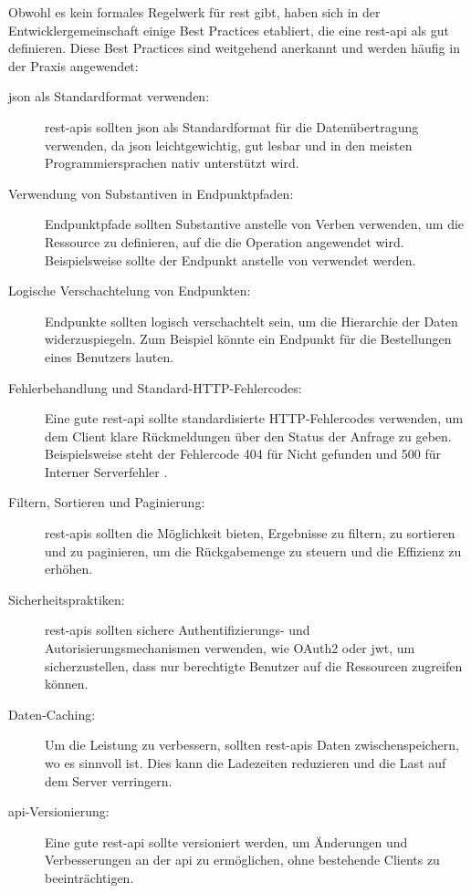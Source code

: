 Obwohl es kein formales Regelwerk für \ac{rest} gibt, haben sich in der Entwicklergemeinschaft einige Best Practices etabliert, die eine \ac{rest}-\ac{api} als gut definieren. Diese Best Practices sind weitgehend anerkannt und werden häufig in der Praxis angewendet:
\begin{description}
    \item[\ac{json} als Standardformat verwenden:] \ac{rest}-\acp{api} sollten \ac{json} als Standardformat für die Datenübertragung verwenden, da \ac{json} leichtgewichtig, gut lesbar und in den meisten Programmiersprachen nativ unterstützt wird.
    \item[Verwendung von Substantiven in Endpunktpfaden:] Endpunktpfade sollten Substantive anstelle von Verben verwenden, um die Ressource zu definieren, auf die die Operation angewendet wird. Beispielsweise sollte der Endpunkt  anstelle von  verwendet werden.
    \item[Logische Verschachtelung von Endpunkten:] Endpunkte sollten logisch verschachtelt sein, um die Hierarchie der Daten widerzuspiegeln. Zum Beispiel könnte ein Endpunkt für die Bestellungen eines Benutzers  lauten.
    \item[Fehlerbehandlung und Standard-HTTP-Fehlercodes:] Eine gute \ac{rest}-\ac{api} sollte standardisierte HTTP-Fehlercodes verwenden, um dem Client klare Rückmeldungen über den Status der Anfrage zu geben. Beispielsweise steht der Fehlercode 404 für \glqq Nicht gefunden \grqq{} und 500 für \glqq Interner Serverfehler \grqq.
    \item[Filtern, Sortieren und Paginierung:] \ac{rest}-\acp{api} sollten die Möglichkeit bieten, Ergebnisse zu filtern, zu sortieren und zu paginieren, um die Rückgabemenge zu steuern und die Effizienz zu erhöhen.
    \item[Sicherheitspraktiken:] \ac{rest}-\acp{api} sollten sichere Authentifizierungs- und Autorisierungsmechanismen verwenden, wie OAuth2 oder \ac{jwt}, um sicherzustellen, dass nur berechtigte Benutzer auf die Ressourcen zugreifen können.
    \item[Daten-Caching:] Um die Leistung zu verbessern, sollten \ac{rest}-\acp{api} Daten zwischenspeichern, wo es sinnvoll ist. Dies kann die Ladezeiten reduzieren und die Last auf dem Server verringern.
    \item[\ac{api}-Versionierung:] Eine gute \ac{rest}-\ac{api} sollte versioniert werden, um Änderungen und Verbesserungen an der \ac{api} zu ermöglichen, ohne bestehende Clients zu beeinträchtigen.
\end{description}

